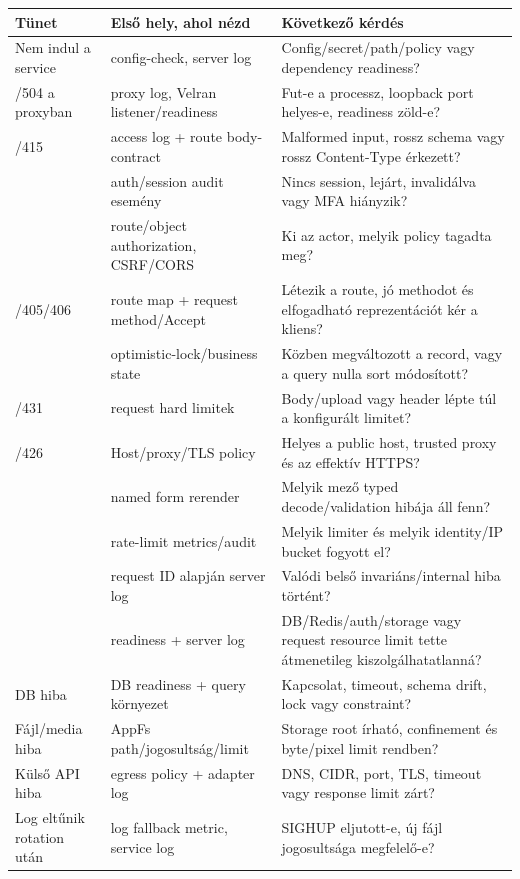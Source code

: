 \begin{longtable}{L{0.23\textwidth}L{0.30\textwidth}L{0.38\textwidth}}
\toprule
Tünet & Első hely, ahol nézd & Következő kérdés \\
\midrule
\endhead
Nem indul a service & config-check, server log & Config/secret/path/policy vagy dependency readiness? \\
/504 a proxyban & proxy log, Velran listener/readiness & Fut-e a processz, loopback port helyes-e, readiness zöld-e? \\
/415 & access log + route body-contract & Malformed input, rossz schema vagy rossz Content-Type érkezett? \\
 & auth/session audit esemény & Nincs session, lejárt, invalidálva vagy MFA hiányzik? \\
 & route/object authorization, CSRF/CORS & Ki az actor, melyik policy tagadta meg? \\
/405/406 & route map + request method/Accept & Létezik a route, jó methodot és elfogadható reprezentációt kér a kliens? \\
 & optimistic-lock/business state & Közben megváltozott a record, vagy a  query nulla sort módosított? \\
/431 & request hard limitek & Body/upload vagy header lépte túl a konfigurált limitet? \\
/426 & Host/proxy/TLS policy & Helyes a public host, trusted proxy és az effektív HTTPS? \\
 & named form rerender & Melyik mező typed decode/validation hibája áll fenn? \\
 & rate-limit metrics/audit & Melyik limiter és melyik identity/IP bucket fogyott el? \\
 & request ID alapján server log & Valódi belső invariáns/internal hiba történt? \\
 & readiness + server log & DB/Redis/auth/storage vagy request resource limit tette átmenetileg kiszolgálhatatlanná? \\
\addlinespace
DB hiba & DB readiness + query környezet & Kapcsolat, timeout, schema drift, lock vagy constraint? \\
\addlinespace
Fájl/media hiba & AppFs path/jogosultság/limit & Storage root írható, confinement és byte/pixel limit rendben? \\
\addlinespace
Külső API hiba & egress policy + adapter log & DNS, CIDR, port, TLS, timeout vagy response limit zárt? \\
\addlinespace
Log eltűnik rotation után & log fallback metric, service log & SIGHUP eljutott-e, új fájl jogosultsága megfelelő-e? \\
\bottomrule
\end{longtable}

